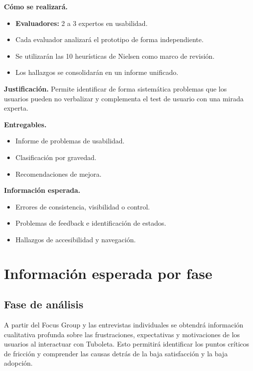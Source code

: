 \documentclass[12pt,letterpaper]{article}
\begin{document}
\textbf{Cómo se realizará.}
\begin{itemize}
    \item \textbf{Evaluadores:} 2 a 3 expertos en usabilidad.
    \item Cada evaluador analizará el prototipo de forma independiente.
    \item Se utilizarán las 10 heurísticas de Nielsen como marco de revisión.
    \item Los hallazgos se consolidarán en un informe unificado.
\end{itemize}

\textbf{Justificación.} Permite identificar de forma sistemática problemas que los usuarios pueden no verbalizar y complementa el test de usuario con una mirada experta.

\textbf{Entregables.}
\begin{itemize}
    \item Informe de problemas de usabilidad.
    \item Clasificación por gravedad.
    \item Recomendaciones de mejora.
\end{itemize}

\textbf{Información esperada.}
\begin{itemize}
    \item Errores de consistencia, visibilidad o control.
    \item Problemas de feedback e identificación de estados.
    \item Hallazgos de accesibilidad y navegación.
\end{itemize}

\section{Información esperada por fase}

\subsection{Fase de análisis}
A partir del Focus Group y las entrevistas individuales se obtendrá información cualitativa profunda sobre las frustraciones, expectativas y motivaciones de los usuarios al interactuar con Tuboleta. Esto permitirá identificar los puntos críticos de fricción y comprender las causas detrás de la baja satisfacción y la baja adopción.
\end{document}
